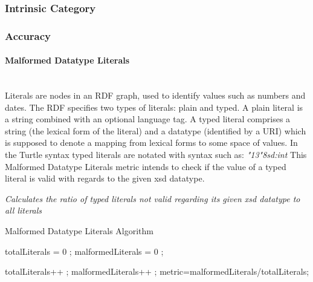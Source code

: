 
\subsubsection{Intrinsic Category}
\label{sec:Intrinsic} 


\subsubsection{Accuracy} %

\paragraph{Malformed Datatype Literals} ~\\ %

Literals are nodes in an RDF graph, used to identify values such as numbers and dates.
The RDF specifies two types of literals: plain and typed. 
A plain literal is a string combined with an optional language tag.
A typed literal comprises a string (the lexical form of the literal) and a datatype (identified by a URI) which is supposed to denote a mapping from lexical forms to some space of values.
In the Turtle syntax typed literals are notated with syntax such as:  \textit{"13"^^xsd:int}
This Malformed Datatype Literals metric intends to check if the value of a typed literal is valid with regards to the given xsd datatype.

\begin{mdframed}[style=metricdefinition]
\emph{Calculates the ratio of typed literals not valid regarding its given xsd datatype to all literals}
\end{mdframed}



\begin{algorithm}
\caption{Malformed Datatype Literals Algorithm}\label{lst:deref}
\begin{algorithmic}[1]
\State totalLiterals = 0 ;
\State malformedLiterals = 0 ;
\EndProcedure

 totalLiterals++ ;
 malformedLiterals++ ; \EndIf
 \EndIf
\State metric=malformedLiterals/totalLiterals;
\EndProcedure
\end{algorithmic}
\end{algorithm}

